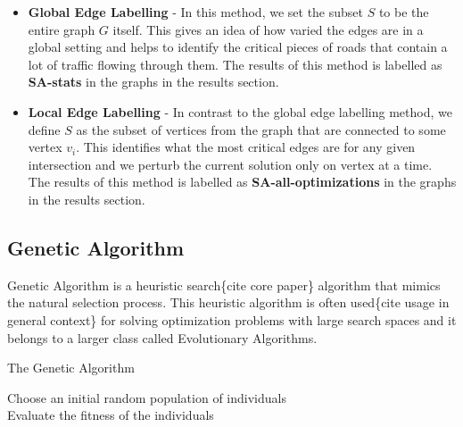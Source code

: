\begin{itemize}
\item \textbf{Global Edge Labelling} - In this method, we set the subset $S$ to be the entire graph $G$ itself. This gives an idea of how varied the edges are in a global setting and helps to identify the critical pieces of roads that contain a lot of traffic flowing through them. The results of this method is labelled as \textbf{SA-stats} in the graphs in the results section.
\item \textbf{Local Edge Labelling} - In contrast to the global edge labelling method, we define $S$ as the subset of vertices from the graph that are connected to some vertex $v_i$. This identifies what the most critical edges are for any given intersection and we perturb the current solution only on vertex at a time. The results of this method is labelled as \textbf{SA-all-optimizations} in the graphs in the results section.
\end{itemize}

\subsection{Genetic Algorithm}
\label{sec:gen-algo}

Genetic Algorithm is a heuristic search\{cite core paper\} algorithm that mimics the natural selection process. This heuristic algorithm is often used\{cite usage in general context\} for solving optimization problems with large search spaces and it belongs to a larger class called Evolutionary Algorithms.

\begin{algorithm}[ht!]
    \caption{The Genetic Algorithm}
    \label{algo:ga}
    Choose an initial random population of individuals\\
    Evaluate the fitness of the individuals\\
\end{algorithm}

